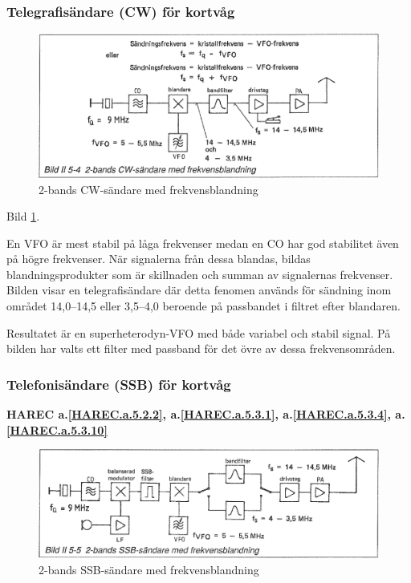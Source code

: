\subsubsection{Telegrafisändare (CW) för kortvåg}

\begin{figure}
  \includegraphics[width=\textwidth]{images/bild_2_5-04}
  \caption{2-bands CW-sändare med frekvensblandning}
  \label{fig:bildII5-4}
\end{figure}

Bild \ref{fig:bildII5-4}.

En VFO är mest stabil på låga frekvenser medan en CO har god
stabilitet även på högre frekvenser. När signalerna från dessa
blandas, bildas blandningsprodukter som är skillnaden och summan av
signalernas frekvenser. Bilden visar en telegrafisändare där detta
fenomen används för sändning inom området 14,0--14,5 eller 3,5--4,0
beroende på passbandet i filtret efter blandaren.

Resultatet är en superheterodyn-VFO med både variabel och stabil
signal. På bilden har valts ett filter med passband för det övre av
dessa frekvensområden.

\subsubsection{Telefonisändare (SSB) för kortvåg}
\textbf{
HAREC a.\ref{HAREC.a.5.2.2}\label{myHAREC.a.5.2.2},
 a.\ref{HAREC.a.5.3.1}\label{myHAREC.a.5.3.1},
 a.\ref{HAREC.a.5.3.4}\label{myHAREC.a.5.3.4},
 a.\ref{HAREC.a.5.3.10}\label{myHAREC.a.5.3.10}
}

\begin{figure}
  \includegraphics[width=\textwidth]{images/bild_2_5-05}
  \caption{2-bands SSB-sändare med frekvensblandning}
  \label{fig:bildII5-5}
\end{figure}

